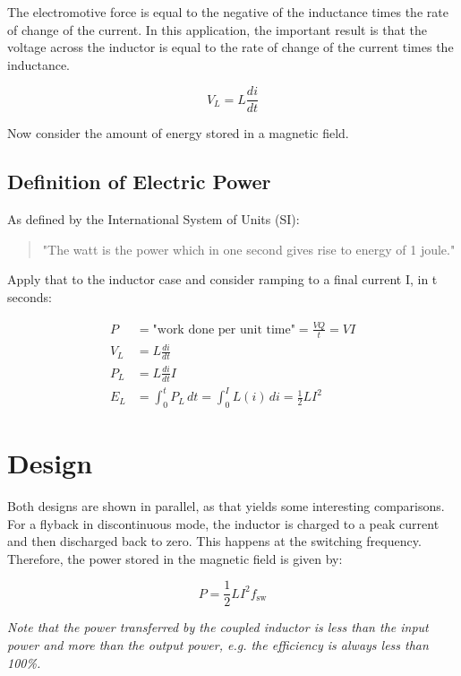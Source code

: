 \documentclass{article}
\begin{document}
The electromotive force is equal to the negative of the inductance times
the rate of change of the current.  In this application,
the important result is that the voltage across the inductor is equal to the
rate of change of the current times the inductance.

\begin{equation}
    V_L = L \frac{di}{dt}
    \label{eq:inductance3}
\end{equation}

Now consider the amount of energy stored in a magnetic field.

\subsection{Definition of Electric Power}
As defined by the International System of Units (SI):
\begin{quote}
"The watt is the power which in one second gives rise to energy of 1 joule." \cite[p. 160]{si2019}
\end{quote}

Apply that to the inductor case and consider ramping to a final current I, in t seconds:

\begin{align}
    P &= \text{"work done per unit time"} = \frac{VQ}{t} = VI \\
    V_L &= L \frac{di}{dt} \\
    P_L &= L \frac{di}{dt} I \\
    E_L &= \int_{0}^{t} P_L \, dt = \int_{0}^{I} L(i) \, di = \frac{1}{2} LI^2
    \label{eq:power2}
\end{align}

\section{Design}

Both designs are shown in parallel, as that yields some interesting 
comparisons.
For a flyback in discontinuous mode, the inductor is charged to a peak
current and then discharged back to zero.  This happens at the switching
frequency.  Therefore, the power stored in the magnetic field is given by:

\begin{equation}
    P = \frac{1}{2} LI^2 f_{\text{sw}}
    \label{eq:power3}
\end{equation}

\emph{Note that the power transferred by the coupled inductor is less than the input power and more than the output power, e.g. the efficiency is always less than 100\%.}
\end{document}
